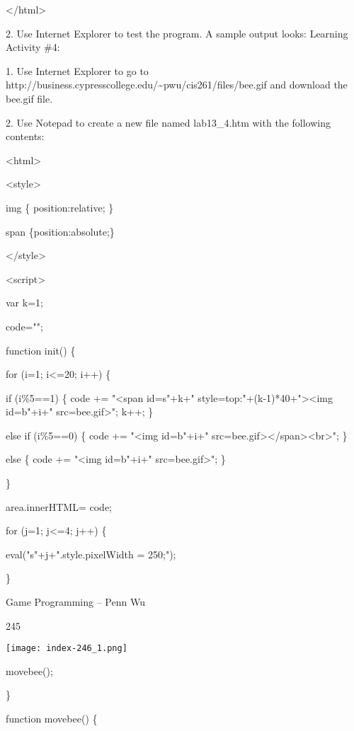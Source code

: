 \documentclass[
]{article}
\begin{document}
\textless/html\textgreater{}

2. Use Internet Explorer to test the program. A sample output looks:
Learning Activity \#4:

1. Use Internet Explorer to go to
http://business.cypresscollege.edu/\textasciitilde pwu/cis261/files/bee.gif
and download the bee.gif file.

2. Use Notepad to create a new file named lab13\_4.htm with the
following contents:

\textless html\textgreater{}

\textless style\textgreater{}

img \{ position:relative; \}

span \{position:absolute;\}

\textless/style\textgreater{}

\textless script\textgreater{}

var k=1;

code="";

function init() \{

for (i=1; i\textless=20; i++) \{

if (i\%5==1) \{ code += "\textless span
id=\textquotesingle s"+k+"\textquotesingle{}
style=\textquotesingle top:"+(k-1)*40+"\textquotesingle\textgreater\textless img
id=\textquotesingle b"+i+"\textquotesingle{}
src=\textquotesingle bee.gif\textquotesingle\textgreater"; k++; \}

else if (i\%5==0) \{ code += "\textless img
id=\textquotesingle b"+i+"\textquotesingle{}
src=\textquotesingle bee.gif\textquotesingle\textgreater\textless/span\textgreater\textless br\textgreater";
\}

else \{ code += "\textless img
id=\textquotesingle b"+i+"\textquotesingle{}
src=\textquotesingle bee.gif\textquotesingle\textgreater"; \}

\}

area.innerHTML= code;

for (j=1; j\textless=4; j++) \{

eval("s"+j+".style.pixelWidth = 250;");

\}

Game Programming -- Penn Wu

245

\protect\hypertarget{index_split_012.htmlux5cux23p246}{}{}\texttt{[image: index-246\_1.png]}

movebee();

\}

function movebee() \{
\end{document}
